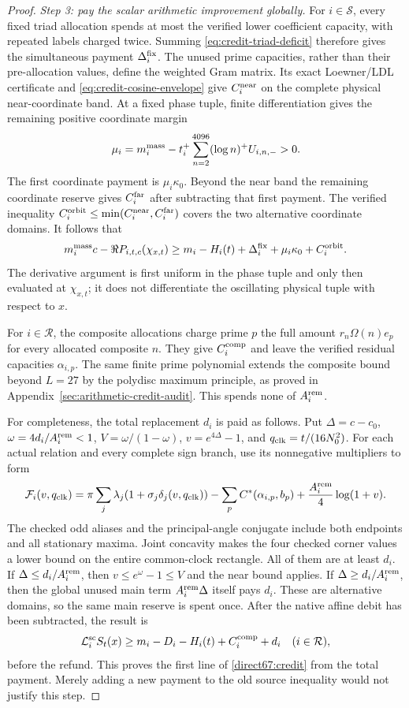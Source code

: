 \documentclass[11pt,a4paper]{article}
\theoremstyle{definition}
\theoremstyle{remark}
\begin{document}
\begin{proof}
\emph{Step 3: pay the scalar arithmetic improvement globally.}
For $i\in\mathcal S$, every fixed triad allocation spends at most the
verified lower coefficient capacity, with repeated labels charged twice.
Summing \eqref{eq:credit-triad-deficit} therefore gives the simultaneous
payment $\Delta_i^{\rm fix}$.  The unused prime capacities, rather than
their pre-allocation values, define the weighted Gram matrix.  Its exact
Loewner/LDL certificate and \eqref{eq:credit-cosine-envelope} give
$C_i^{\rm near}$ on the complete physical near-coordinate band.
At a fixed phase tuple, finite differentiation gives the remaining
positive coordinate margin
\[
 \mu_i=m_i^{\rm mass}
       -t_i^+\sum_{n=2}^{4096}(\log n)^+U_{i,n,-}>0.
\]
The first coordinate payment is $\mu_i\kappa_0$.  Beyond the near
band the remaining coordinate reserve gives $C_i^{\rm far}$ after
subtracting that first payment.  The verified inequality
$C_i^{\rm orbit}\le\min(C_i^{\rm near},C_i^{\rm far})$ covers the
two alternative coordinate domains.  It follows that
\[
 m_i^{\rm mass}c-\Re P_{i,t,c}(\chi_{x,t})
 \ge m_i-H_i(t)+\Delta_i^{\rm fix}
                      +\mu_i\kappa_0+C_i^{\rm orbit}.
\]
The derivative argument is first uniform in the phase tuple and only
then evaluated at $\chi_{x,t}$; it does not differentiate the oscillating
physical tuple with respect to $x$.

For $i\in\mathcal R$, the composite allocations charge prime $p$ the
full amount $r_n\Omega(n)e_p$ for every allocated composite $n$.
They give $C_i^{\rm comp}$ and leave the verified residual capacities
$\alpha_{i,p}$.  The same finite prime polynomial extends the composite
bound beyond $L=27$ by the polydisc maximum principle, as proved in
Appendix~\ref{sec:arithmetic-credit-audit}.  This spends none of
$A_i^{\rm rem}$.

For completeness, the total replacement $d_i$ is paid as follows.
Put $\Delta=c-c_0$, $\omega=4d_i/A_i^{\rm rem}<1$,
$V=\omega/(1-\omega)$, $v=e^{4\Delta}-1$, and
$q_{\rm clk}=t/(16N_0^2)$.  For each actual relation and every complete
sign branch, use its nonnegative multipliers to form
\[
 \mathcal F_i(v,q_{\rm clk})=
 \pi\sum_j\lambda_j(1+\sigma_j\delta_j(v,q_{\rm clk}))
 -\sum_p C^*(\alpha_{i,p},b_p)
 +\frac{A_i^{\rm rem}}4\log(1+v).
\]
The checked odd aliases and the principal-angle conjugate include both
endpoints and all stationary maxima.  Joint concavity makes the four
checked corner values a lower bound on the entire common-clock
rectangle.  All of them are at least $d_i$.  If $\Delta\le d_i/A_i^{\rm rem}$,
then $v\le e^\omega-1\le V$ and the near bound applies.  If
$\Delta\ge d_i/A_i^{\rm rem}$, then the global unused main term
$A_i^{\rm rem}\Delta$ itself pays $d_i$.  These are alternative
domains, so the same main reserve is spent once.  After the native
affine debit has been subtracted, the result is
\[
 \mathcal L_i^{\rm sc}S_t(x)
 \ge m_i-D_i-H_i(t)+C_i^{\rm comp}+d_i
       \quad(i\in\mathcal R),
\]
before the refund.  This proves the first line of
\eqref{direct67:credit} from the total payment.  Merely adding a new
payment to the old source inequality would not justify this step.


\end{proof}
\end{document}
